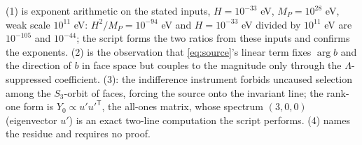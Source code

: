 (1) is exponent arithmetic on the stated inputs, $H = 10^{-33}$ eV, $M_{P} = 10^{28}$ eV, weak scale $10^{11}$ eV: $H^{2}/M_{P} = 10^{-94}$ eV and $H = 10^{-33}$ eV divided by $10^{11}$ eV are $10^{-105}$ and $10^{-44}$; the script forms the two ratios from these inputs and confirms the exponents. (2) is the observation that \eqref{eq:source}'s linear term fixes $\arg b$ and the direction of $b$ in face space but couples to the magnitude only through the $\Lambda$-suppressed coefficient. (3): the indifference instrument forbids uncaused selection among the $S_{3}$-orbit of faces, forcing the source onto the invariant line; the rank-one form is $Y_{0} \propto u'u'^{\mathsf{T}}$, the all-ones matrix, whose spectrum $(3, 0, 0)$ (eigenvector $u'$) is an exact two-line computation the script performs. (4) names the residue and requires no proof.
